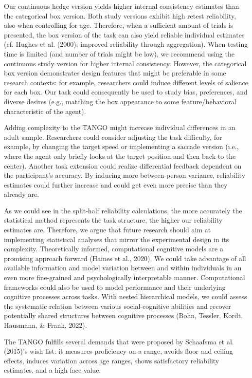 \documentclass[
  man,floatsintext]{apa6}
\begin{document}
Our continuous hedge version yields higher internal consistency estimates than the categorical box version.
Both study versions exhibit high retest reliability, also when controlling for age.
Therefore, when a sufficient amount of trials is presented, the box version of the task can also yield reliable individual estimates (cf. Hughes et al. (2000); improved reliability through aggregation).
When testing time is limited (and number of trials might be low), we recommend using the continuous study version for higher internal consistency.
However, the categorical box version demonstrates design features that might be preferable in some research contexts: for example, researchers could induce different levels of salience for each box.
Our task could consequently be used to study bias, preferences, and diverse desires (e.g., matching the box appearance to some feature/behavioral characteristic of the agent).

Adding complexity to the TANGO might increase individual differences in an adult sample.
Researchers could consider adjusting the task difficulty, for example, by changing the target speed or implementing a saccade version (i.e., where the agent only briefly looks at the target position and then back to the center).
Another task extension could realize differential feedback dependent on the participant's accuracy.
By inducing more between-person variance, reliability estimates could further increase and could get even more precise than they already are.

As we could see in the split-half reliability calculations, the more accurately the statistical method represents the task structure, the higher our reliability estimates are.
Therefore, we argue that future research should aim at implementing statistical analyses that mirror the experimental design in its complexity.
Theoretically informed, computational cognitive models are a promising approach forward (Haines et al., 2020).
We could take advantage of all available information and model variation between and within individuals in an even more fine-grained and psychologically interpretable manner.
Computational frameworks could also be used to model performance and their underlying cognitive processes across tasks.
With nested hierarchical models, we could assess the systematic relation between various social-cognitive abilities and recover potentially shared structures between cognitive processes (Bohn, Tessler, Kordt, Hausmann, \& Frank, 2022).

The TANGO fulfills several demands that were proposed by Schaafsma et al. (2015)'s wish list: it measures proficiency on a range, avoids floor and ceiling effects, induces variation across age ranges, shows satisfactory reliability estimates, and a high face value.
\end{document}
